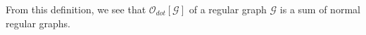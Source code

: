 \documentclass{article}
\newcommand{\1}{\mathds{1}}
\numberwithin{equation}{section}
\newcommand{\ord}{{\rm{ord}}}
\renewcommand{\cal}{\mathcal}
\DeclareMathOperator{\OO}{O}
\theoremstyle{plain} %
\newtheorem{lemma}[theorem]{Lemma}
\theoremstyle{remark}
\begin{document}
From this definition, we see that $\cal O_{dot}[\cal G]$ of a regular graph $\cal G$ is a sum of normal regular graphs. %


  
\end{document}
